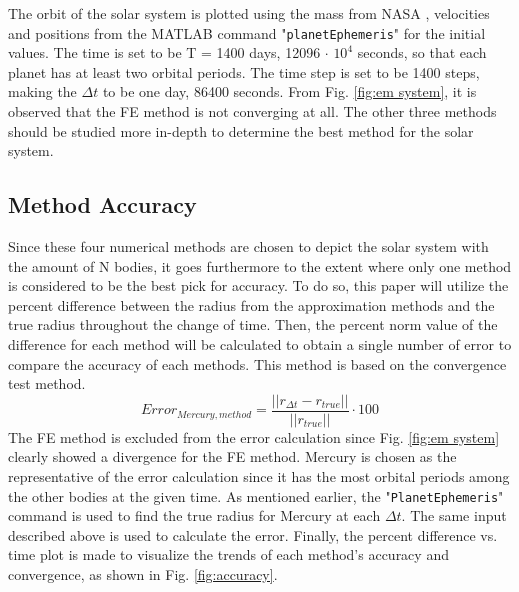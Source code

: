 \documentclass[conf]{new-aiaa}
\begin{document}
    The orbit of the solar system is plotted using the mass from NASA \cite{NASAplanet}, velocities and positions from the MATLAB command "\lstinline|planetEphemeris|" for the initial values. The time is set to be T = 1400 days, 12096 $\cdot$ $10^4$ seconds, so that each planet has at least two orbital periods. The time step is set to be 1400 steps, making the $\Delta t$ to be one day, 86400 seconds. From Fig. \ref{fig:em system}, it is observed that the FE method is not converging at all. The other three methods should be studied more in-depth to determine the best method for the solar system.
    
    \subsection{Method Accuracy}
    Since these four numerical methods are chosen to depict the solar system with the amount of N bodies, it goes furthermore to the extent where only one method is considered to be the best pick for accuracy. To do so, this paper will utilize the percent difference between the radius from the approximation methods and the true radius throughout the change of time. Then, the percent norm value of the difference for each method will be calculated to obtain a single number of error to compare the accuracy of each methods. This method is based on the convergence test method.
    \begin{equation}
        Error_{Mercury, method } =  \frac{||r_{\Delta t}-r_{true}||}{||r_{true}||}\cdot 100
        \label{eq:norm}
    \end{equation}
    The FE method is excluded from the error calculation since Fig. \ref{fig:em system} clearly showed a divergence for the FE method. Mercury is chosen as the representative of the error calculation since it has the most orbital periods among the other bodies at the given time. As mentioned earlier, the "\lstinline|PlanetEphemeris|" command is used to find the true radius for Mercury at each $\Delta t$. The same input described above is used to calculate the error. 
    Finally, the percent difference vs. time plot is made to visualize the trends of each method's accuracy and convergence, as shown in Fig. \ref{fig:accuracy}. 
    
\end{document}
